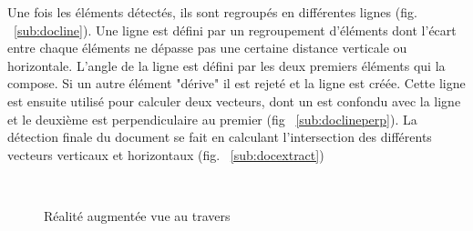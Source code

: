 Une fois les éléments détectés, ils sont regroupés en différentes lignes (fig. ~\ref{sub:docline}).
Une ligne est défini par un regroupement d'éléments dont l'écart entre chaque éléments ne dépasse pas une certaine distance verticale ou horizontale. L'angle de la ligne est défini par les deux premiers éléments qui la compose. Si un autre élément "dérive" il est rejeté et la ligne est créée. Cette ligne est ensuite utilisé pour calculer deux vecteurs, dont un est confondu avec la ligne et le deuxième est perpendiculaire au premier (fig ~\ref{sub:doclineperp}).
La détection finale du document se fait en calculant l'intersection des différents vecteurs verticaux et horizontaux (fig. ~\ref{sub:docextract})

\begin{figure}[H]
    \centering
      \\
\caption{Réalité augmentée vue au travers}
\label{fig:STAR}
\end{figure}

